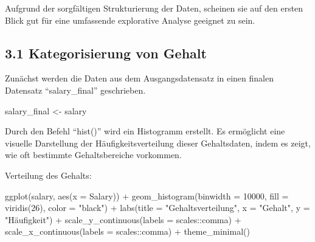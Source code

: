 \documentclass[
  letterpaper,
  DIV=11,
  numbers=noendperiod]{scrartcl}
\newenvironment{Shaded}{\begin{snugshade}}{\end{snugshade}}
\newcommand{\AttributeTok}[1]{\textcolor[rgb]{0.40,0.45,0.13}{#1}}
\newcommand{\DecValTok}[1]{\textcolor[rgb]{0.68,0.00,0.00}{#1}}
\newcommand{\FunctionTok}[1]{\textcolor[rgb]{0.28,0.35,0.67}{#1}}
\newcommand{\NormalTok}[1]{\textcolor[rgb]{0.00,0.23,0.31}{#1}}
\newcommand{\OtherTok}[1]{\textcolor[rgb]{0.00,0.23,0.31}{#1}}
\newcommand{\SpecialCharTok}[1]{\textcolor[rgb]{0.37,0.37,0.37}{#1}}
\newcommand{\StringTok}[1]{\textcolor[rgb]{0.13,0.47,0.30}{#1}}
\begin{document}
Aufgrund der sorgfältigen Strukturierung der Daten, scheinen sie auf den
ersten Blick gut für eine umfassende explorative Analyse geeignet zu
sein.

\hypertarget{kategorisierung-von-gehalt}{%
\subsection{3.1 Kategorisierung von
Gehalt}\label{kategorisierung-von-gehalt}}

Zunächst werden die Daten aus dem Ausgangsdatensatz in einen finalen
Datensatz ``salary\_final'' geschrieben.

\begin{Shaded}
\begin{Highlighting}[]
\NormalTok{salary\_final }\OtherTok{\textless{}{-}}\NormalTok{ salary}
\end{Highlighting}
\end{Shaded}

Durch den Befehl ``hist()'' wird ein Histogramm erstellt. Es ermöglicht
eine visuelle Darstellung der Häufigkeitsverteilung dieser Gehaltsdaten,
indem es zeigt, wie oft bestimmte Gehaltsbereiche vorkommen.

Verteilung des Gehalts:

\begin{Shaded}
\begin{Highlighting}[]
\FunctionTok{ggplot}\NormalTok{(salary, }\FunctionTok{aes}\NormalTok{(}\AttributeTok{x =}\NormalTok{ Salary)) }\SpecialCharTok{+}
  \FunctionTok{geom\_histogram}\NormalTok{(}\AttributeTok{binwidth =} \DecValTok{10000}\NormalTok{, }\AttributeTok{fill =} \FunctionTok{viridis}\NormalTok{(}\DecValTok{26}\NormalTok{), }\AttributeTok{color =} \StringTok{"black"}\NormalTok{) }\SpecialCharTok{+}
  \FunctionTok{labs}\NormalTok{(}\AttributeTok{title =} \StringTok{"Gehaltsverteilung"}\NormalTok{,}
       \AttributeTok{x =} \StringTok{"Gehalt"}\NormalTok{,}
       \AttributeTok{y =} \StringTok{"Häufigkeit"}\NormalTok{) }\SpecialCharTok{+}
  \FunctionTok{scale\_y\_continuous}\NormalTok{(}\AttributeTok{labels =}\NormalTok{ scales}\SpecialCharTok{::}\NormalTok{comma) }\SpecialCharTok{+}
  \FunctionTok{scale\_x\_continuous}\NormalTok{(}\AttributeTok{labels =}\NormalTok{ scales}\SpecialCharTok{::}\NormalTok{comma) }\SpecialCharTok{+}
  \FunctionTok{theme\_minimal}\NormalTok{()}
\end{Highlighting}
\end{Shaded}
\end{document}
